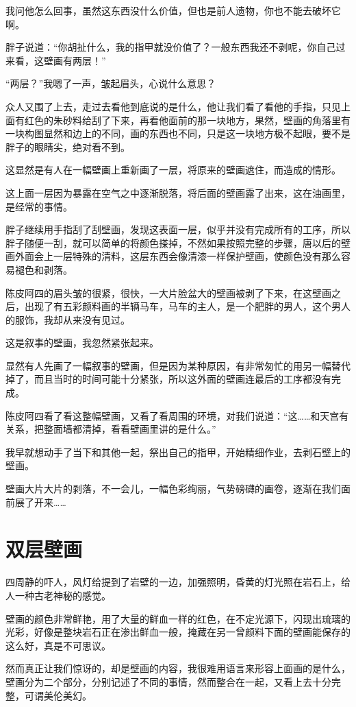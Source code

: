 我问他怎么回事，虽然这东西没什么价值，但也是前人遗物，你也不能去破坏它啊。

胖子说道：“你胡扯什么，我的指甲就没价值了？一般东西我还不剥呢，你自己过来看，这壁画有两层！”

“两层？”我嗯了一声，皱起眉头，心说什么意思？

众人又围了上去，走过去看他到底说的是什么，他让我们看了看他的手指，只见上面有红色的朱砂料给刮了下来，再看他面前的那一块地方，果然，壁画的角落里有一块构图显然和边上的不同，画的东西也不同，只是这一块地方极不起眼，要不是胖子的眼睛尖，绝对看不到。

这显然是有人在一幅壁画上重新画了一层，将原来的壁画遮住，而造成的情形。

这上面一层因为暴露在空气之中逐渐脱落，将后面的壁画露了出来，这在油画里，是经常的事情。

胖子继续用手指刮了刮壁画，发现这表面一层，似乎并没有完成所有的工序，所以胖子随便一刮，就可以简单的将颜色搽掉，不然如果按照完整的步骤，唐以后的壁画外面会上一层特殊的清料，这层东西会像清漆一样保护壁画，使颜色没有那么容易褪色和剥落。

陈皮阿四的眉头皱的很紧，很快，一大片脸盆大的壁画被剥了下来，在这壁画之后，出现了有五彩颜料画的半辆马车，马车的主人，是一个肥胖的男人，这个男人的服饰，我却从来没有见过。

这是叙事的壁画，我忽然紧张起来。

显然有人先画了一幅叙事的壁画，但是因为某种原因，有非常匆忙的用另一幅替代掉了，而且当时的时间可能十分紧张，所以这外面的壁画连最后的工序都没有完成。

陈皮阿四看了看这整幅壁画，又看了看周围的环境，对我们说道：“这……和天宫有关系，把整面墙都清掉，看看壁画里讲的是什么。”

我早就想动手了当下和其他一起，祭出自己的指甲，开始精细作业，去剥石壁上的壁画。

壁画大片大片的剥落，不一会儿，一幅色彩绚丽，气势磅礴的画卷，逐渐在我们面前展了开来……

\chapter{双层壁画}

四周静的吓人，风灯给提到了岩壁的一边，加强照明，昏黄的灯光照在岩石上，给人一种古老神秘的感觉。

壁画的颜色非常鲜艳，用了大量的鲜血一样的红色，在不定光源下，闪现出琉璃的光彩，好像是整块岩石正在渗出鲜血一般，掩藏在另一曾颜料下面的壁画能保存的这么好，真是不可思议。

然而真正让我们惊讶的，却是壁画的内容，我很难用语言来形容上面画的是什么，壁画分为二个部分，分别记述了不同的事情，然而整合在一起，又看上去十分完整，可谓美伦美幻。

